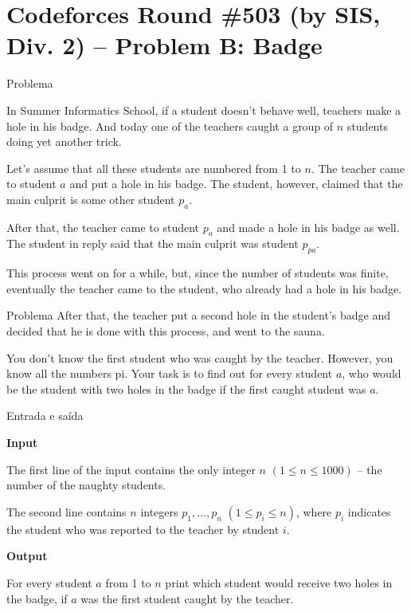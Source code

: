 \section{Codeforces Round \#503 (by SIS, Div. 2) -- Problem B: Badge}

\begin{frame}[fragile]{Problema}

In Summer Informatics School, if a student doesn't behave well, teachers make a hole in his badge. 
And today one of the teachers caught a group of $n$ students doing yet another trick.

Let's assume that all these students are numbered from 1 to $n$. The teacher came to student $a$ 
and put a hole in his badge. The student, however, claimed that the main culprit is some other 
student $p_a$.

After that, the teacher came to student $p_a$ and made a hole in his badge as well. The student in 
reply said that the main culprit was student $p_{pa}$.

This process went on for a while, but, since the number of students was finite, eventually the teacher came to the student, who already had a hole in his badge.
\end{frame}

\begin{frame}[fragile]{Problema}
After that, the teacher put a second hole in the student's badge and decided that he is done with this process, and went to the sauna.

You don't know the first student who was caught by the teacher. However, you know all the numbers pi. Your task is to find out for every student $a$, who would be the student with two holes in the badge if the first caught student was $a$.
\end{frame}

\begin{frame}[fragile]{Entrada e saída}

\textbf{Input}

The first line of the input contains the only integer $n$ $(1\leq n\leq 1000)$ -- the number of the naughty students.

The second line contains $n$ integers $p_1, \ldots, p_n$ $(1\leq p_i\leq n)$, where $p_i$ indicates 
the student who was reported to the teacher by student $i$.

\textbf{Output}

For every student $a$ from 1 to $n$ print which student would receive two holes in the badge, if $a$ was the first student caught by the teacher.

\end{frame}

